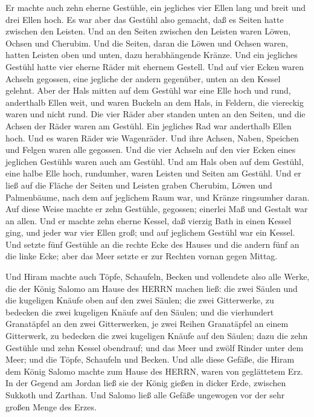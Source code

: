  Er machte auch zehn eherne Gestühle, ein jegliches vier
Ellen lang und breit und drei Ellen hoch.  Es war aber das
Gestühl also gemacht, daß es Seiten hatte zwischen den Leisten.
 Und an den Seiten zwischen den Leisten waren Löwen, Ochsen
und Cherubim. Und die Seiten, daran die Löwen und Ochsen waren, hatten
Leisten oben und unten, dazu herabhängende Kränze.  Und ein
jegliches Gestühl hatte vier eherne Räder mit ehernem Gestell. Und auf
vier Ecken waren Achseln gegossen, eine jegliche der andern gegenüber,
unten an den Kessel gelehnt.  Aber der Hals mitten auf dem
Gestühl war eine Elle hoch und rund, anderthalb Ellen weit, und waren
Buckeln an dem Hals, in Feldern, die viereckig waren und nicht rund.
 Die vier Räder aber standen unten an den Seiten, und die
Achsen der Räder waren am Gestühl. Ein jegliches Rad war anderthalb
Ellen hoch.  Und es waren Räder wie Wagenräder. Und ihre
Achsen, Naben, Speichen und Felgen waren alle gegossen. 
Und die vier Achseln auf den vier Ecken eines jeglichen Gestühls waren
auch am Gestühl.  Und am Hals oben auf dem Gestühl, eine
halbe Elle hoch, rundumher, waren Leisten und Seiten am Gestühl.
 Und er ließ auf die Fläche der Seiten und Leisten graben
Cherubim, Löwen und Palmenbäume, nach dem auf jeglichem Raum war, und
Kränze ringsumher daran.  Auf diese Weise machte er zehn
Gestühle, gegossen; einerlei Maß und Gestalt war an allen. 
Und er machte zehn eherne Kessel, daß vierzig Bath in einen Kessel ging,
und jeder war vier Ellen groß; und auf jeglichem Gestühl war ein Kessel.
 Und setzte fünf Gestühle an die rechte Ecke des Hauses und
die andern fünf an die linke Ecke; aber das Meer setzte er zur Rechten
vornan gegen Mittag.

 Und Hiram machte auch Töpfe, Schaufeln, Becken und
vollendete also alle Werke, die der König Salomo am Hause des HERRN
machen ließ:  die zwei Säulen und die kugeligen Knäufe oben
auf den zwei Säulen; die zwei Gitterwerke, zu bedecken die zwei
kugeligen Knäufe auf den Säulen;  und die vierhundert
Granatäpfel an den zwei Gitterwerken, je zwei Reihen Granatäpfel an
einem Gitterwerk, zu bedecken die zwei kugeligen Knäufe auf den Säulen;
 dazu die zehn Gestühle und zehn Kessel obendrauf;
 und das Meer und zwölf Rinder unter dem Meer;
 und die Töpfe, Schaufeln und Becken. Und alle diese
Gefäße, die Hiram dem König Salomo machte zum Hause des HERRN, waren von
geglättetem Erz.  In der Gegend am Jordan ließ sie der
König gießen in dicker Erde, zwischen Sukkoth und Zarthan. 
Und Salomo ließ alle Gefäße ungewogen vor der sehr großen Menge des
Erzes.

